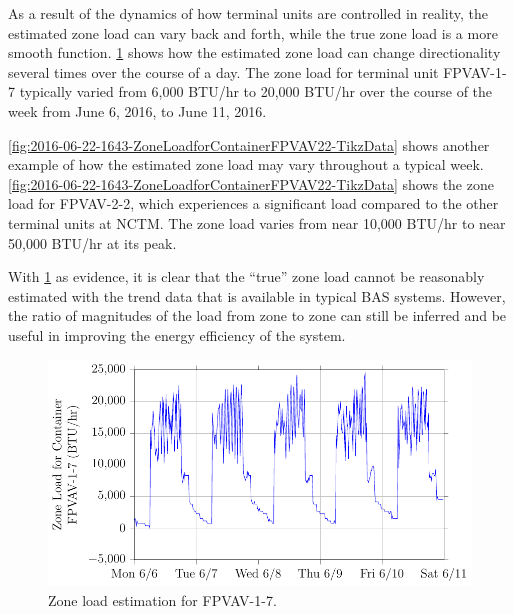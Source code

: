 As a result of the dynamics of how terminal units are controlled in reality,
the estimated zone load can vary back and forth, while the true zone load is a
more smooth function. \figref{}
\ref{fig:2016-06-22-1654-ZoneLoadforContainerFPVAV17-TikzData} shows how the
estimated zone load can change directionality several times over the course of
a day. The zone load for terminal unit FPVAV-1-7 typically varied from 6,000
BTU/hr to 20,000 BTU/hr over the course of the week from June 6, 2016, to June
11, 2016.

\figref{} \ref{fig:2016-06-22-1643-ZoneLoadforContainerFPVAV22-TikzData}
shows another example of how the estimated zone load may vary throughout
a typical week. \figref{}
\ref{fig:2016-06-22-1643-ZoneLoadforContainerFPVAV22-TikzData} shows the
zone load for FPVAV-2-2, which experiences a significant load compared
to the other terminal units at NCTM. The zone load varies from near
10,000 BTU/hr to near 50,000 BTU/hr at its peak.

With \figref{}
\ref{fig:2016-06-22-1654-ZoneLoadforContainerFPVAV17-TikzData} as
evidence, it is clear that the ``true'' zone load cannot be reasonably
estimated with the trend data that is available in typical BAS systems.
However, the ratio of magnitudes of the load from zone to zone can still
be inferred and be useful in improving the energy efficiency of the
system.  

\begin{figure}
\centering
\includegraphics[]{Plots/2016-06-22-1654-ZoneLoadforContainerFPVAV17-TikzData.pdf}
\caption{Zone load estimation for FPVAV-1-7.}
\label{fig:2016-06-22-1654-ZoneLoadforContainerFPVAV17-TikzData}
\end{figure}

